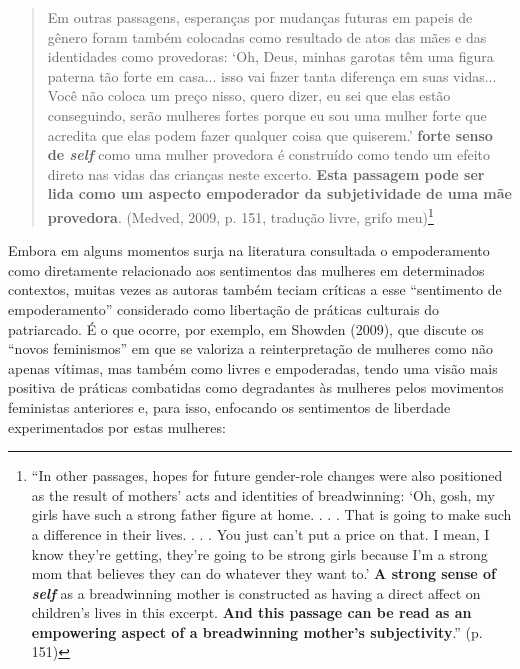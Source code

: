 \begin{quote}
    Em outras passagens, esperanças por mudanças futuras em papeis de gênero foram também colocadas como resultado de atos das mães e das identidades como provedoras: ‘Oh, Deus, minhas garotas têm uma figura paterna tão forte em casa... isso vai fazer tanta diferença em suas vidas... Você não coloca um preço nisso, quero dizer, eu sei que elas estão conseguindo, serão mulheres fortes porque eu sou uma mulher forte que acredita que elas podem fazer qualquer coisa que quiserem.’ \textbf{forte senso de \textit{self}} como uma mulher provedora é construído como tendo um efeito direto nas vidas das crianças neste excerto. \textbf{Esta passagem pode ser lida como um aspecto empoderador da subjetividade de uma mãe provedora}. (Medved, 2009, p. 151, tradução livre, grifo meu)\footnote{``In other passages, hopes for future gender-role changes were also positioned as the result of mothers’ acts and identities of breadwinning: ‘Oh, gosh, my girls have such a strong father figure at home. . . . That is going to make such a difference in their lives. . . . You just can’t put a price on that. I mean, I know they’re getting, they’re going to be strong girls because I’m a strong mom that believes they can do whatever they want to.’ \textbf{A strong sense of \textit{self}} as a breadwinning mother is constructed as having a direct affect on children’s lives in this excerpt. \textbf{And this passage can be read as an empowering aspect of a breadwinning mother’s subjectivity}.'' (p. 151)}
\end{quote}

Embora em alguns momentos surja na literatura consultada o empoderamento como diretamente relacionado aos sentimentos das mulheres em determinados contextos, muitas vezes as autoras também teciam críticas a esse ``sentimento de empoderamento'' considerado como libertação de práticas culturais do patriarcado. É o que ocorre, por exemplo, em Showden (2009), que discute os ``novos feminismos'' em que se valoriza a reinterpretação de mulheres como não apenas vítimas, mas também como livres e empoderadas, tendo uma visão mais positiva de práticas combatidas como degradantes às mulheres pelos movimentos feministas anteriores e, para isso, enfocando os sentimentos de liberdade experimentados por estas mulheres:


